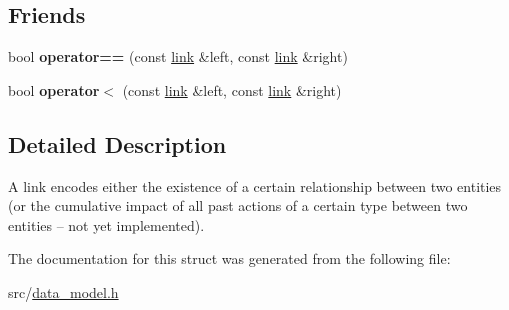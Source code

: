 \subsection*{Friends}
\begin{DoxyCompactItemize}
\item 
\mbox{\label{structtricl_1_1link_a383e61e15072ef3fe9e16102dea483e0}} 
bool {\bfseries operator==} (const \hyperlink{structtricl_1_1link}{link} \&left, const \hyperlink{structtricl_1_1link}{link} \&right)
\item 
\mbox{\label{structtricl_1_1link_af79bc13140c8180154526642748b0c33}} 
bool {\bfseries operator$<$} (const \hyperlink{structtricl_1_1link}{link} \&left, const \hyperlink{structtricl_1_1link}{link} \&right)
\end{DoxyCompactItemize}


\subsection{Detailed Description}
A link encodes either the existence of a certain relationship between two entities (or the cumulative impact of all past actions of a certain type between two entities -- not yet implemented). 

The documentation for this struct was generated from the following file\+:\begin{DoxyCompactItemize}
\item 
src/\hyperlink{data__model_8h}{data\+\_\+model.\+h}\end{DoxyCompactItemize}
